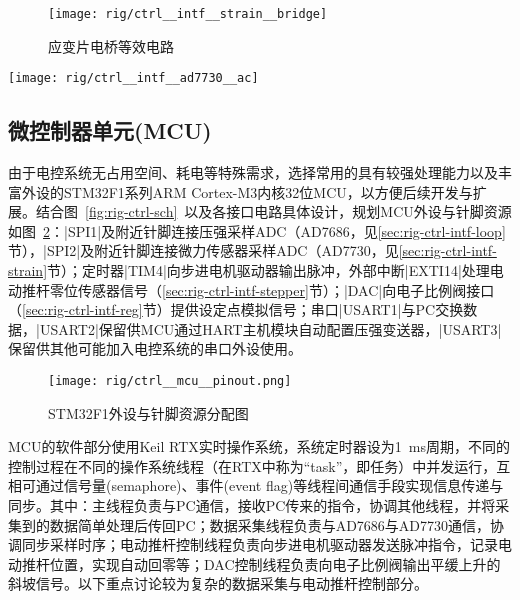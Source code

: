 \begin{figure}[p]
\centering
\texttt{[image: rig/ctrl\_\_intf\_\_strain\_\_bridge]}
\caption{应变片电桥等效电路}
\label{fig:rig-ctrl-strain-bridge}
\end{figure}

\begin{sidewaysfigure}[p]
\centering
\texttt{[image: rig/ctrl\_\_intf\_\_ad7730\_\_ac]}
\caption{AD7730电桥接口 -- 接法示意图}
\label{fig:rig-ctrl-ad7730-ac}
\end{sidewaysfigure}


\clearpage


\subsection{微控制器单元(MCU)}\label{sec:rig-ctrl-mcu}

由于电控系统无占用空间、耗电等特殊需求，选择常用的具有较强处理能力以及丰富外设的STM32F1系列ARM Cortex-M3内核32位MCU，以方便后续开发与扩展。结合图~\ref{fig:rig-ctrl-sch}~以及各接口电路具体设计，规划MCU外设与针脚资源如图~\ref{fig:rig-ctrl-mcu-pinout}：\bverb|SPI1|及附近针脚连接压强采样ADC（AD7686，见\ref{sec:rig-ctrl-intf-loop}节），\bverb|SPI2|及附近针脚连接微力传感器采样ADC（AD7730，见\ref{sec:rig-ctrl-intf-strain}节）；定时器\bverb|TIM4|向步进电机驱动器输出脉冲，外部中断\bverb|EXTI14|处理电动推杆零位传感器信号（\ref{sec:rig-ctrl-intf-stepper}节）；\bverb|DAC|向电子比例阀接口（\ref{sec:rig-ctrl-intf-reg}节）提供设定点模拟信号；串口\bverb|USART1|与PC交换数据，\bverb|USART2|保留供MCU通过HART主机模块自动配置压强变送器，\bverb|USART3|保留供其他可能加入电控系统的串口外设使用。

\begin{figure}[tbhp]
\centering
\texttt{[image: rig/ctrl\_\_mcu\_\_pinout.png]}
\caption{STM32F1外设与针脚资源分配图}
\label{fig:rig-ctrl-mcu-pinout}
\end{figure}

MCU的软件部分使用Keil RTX实时操作系统，系统定时器设为\SI{1}{\milli\second}周期，不同的控制过程在不同的操作系统线程（在RTX中称为``task''，即任务）中并发运行，互相可通过信号量(semaphore)、事件(event flag)等线程间通信手段实现信息传递与同步。其中：主线程负责与PC通信，接收PC传来的指令，协调其他线程，并将采集到的数据简单处理后传回PC；数据采集线程负责与AD7686与AD7730通信，协调同步采样时序；电动推杆控制线程负责向步进电机驱动器发送脉冲指令，记录电动推杆位置，实现自动回零等；DAC控制线程负责向电子比例阀输出平缓上升的斜坡信号。以下重点讨论较为复杂的数据采集与电动推杆控制部分。

